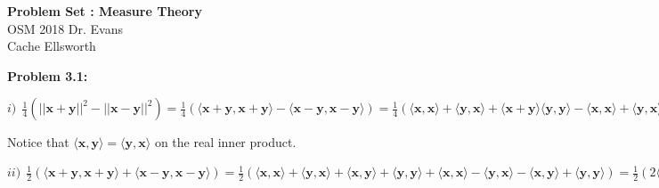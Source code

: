 \documentclass[letterpaper,12pt]{article}
\theoremstyle{definition}
\begin{document}
\begin{flushleft}
  \textbf{\large{Problem Set : Measure Theory}} \\
  OSM 2018 Dr. Evans \\
  Cache Ellsworth
  \end{flushleft}

\vspace{5mm}

\noindent\textbf{Problem 3.1:}\\
\begin{center} 
$i ) \:\: \frac{1}{4} ( ||\mathbf{x}+\mathbf{y}||^2 - ||\mathbf{x}-\mathbf{y}||^2) = \frac{1}{4}( \langle \mathbf{x}+\mathbf{y}, \mathbf{x} + \mathbf{y} \rangle    - \langle \mathbf{x}-\mathbf{y}, \mathbf{x}-\mathbf{y} \rangle   ) = \frac{1}{4}(\langle \mathbf{x}, \mathbf{x} \rangle    + \langle \mathbf{y}, \mathbf{x} \rangle    + \langle \mathbf{x} + \mathbf{y} \rangle    \langle \mathbf{y}, \mathbf{y} \rangle    - \langle \mathbf{x}, \mathbf{x} \rangle    + \langle \mathbf{y}, \mathbf{x} \rangle    + \langle \mathbf{x}, \mathbf{y} \rangle    - \langle \mathbf{y}, \mathbf{y} \rangle   ) = \frac{1}{4}(2\langle \mathbf{y}, \mathbf{x} \rangle    + 2\langle \mathbf{x}, \mathbf{y} \rangle   ) = \langle \mathbf{x}, \mathbf{y} \rangle   $
\end{center}
\noindent Notice that $\langle \mathbf{x}, \mathbf{y} \rangle    = \langle  \mathbf{y}, \mathbf{x} \rangle   $ on the real inner product. \\

\begin{center}
$ii ) \:\: \frac{1}{2}(\langle \mathbf{x} + \mathbf{y}, \mathbf{x} + \mathbf{y} \rangle    + \langle  \mathbf{x} - \mathbf{y}, \mathbf{x} - \mathbf{y} \rangle   ) = \frac{1}{2}(\langle \mathbf{x}, \mathbf{x} \rangle    + \langle \mathbf{y}, \mathbf{x} \rangle    +\langle \mathbf{x}, \mathbf{y} \rangle    + \langle  \mathbf{y}, \mathbf{y} \rangle    + \langle \mathbf{x} , \mathbf{x} \rangle    - \langle \mathbf{y}, \mathbf{x} \rangle    - \langle \mathbf{x}, \mathbf{y} \rangle    + \langle \mathbf{y}, \mathbf{y} \rangle   ) = \frac{1}{2}(2\langle \mathbf{x}, \mathbf{x} \rangle    + 2\langle \mathbf{y}, \mathbf{y} \rangle   ) = \langle \mathbf{x}, \mathbf{x} \rangle    + \langle \mathbf{y}, \mathbf{y} \rangle    = ||\mathbf{x}||^2 + ||\mathbf{y}||^2$
\end{center}
\vspace{5mm}
\end{document}
